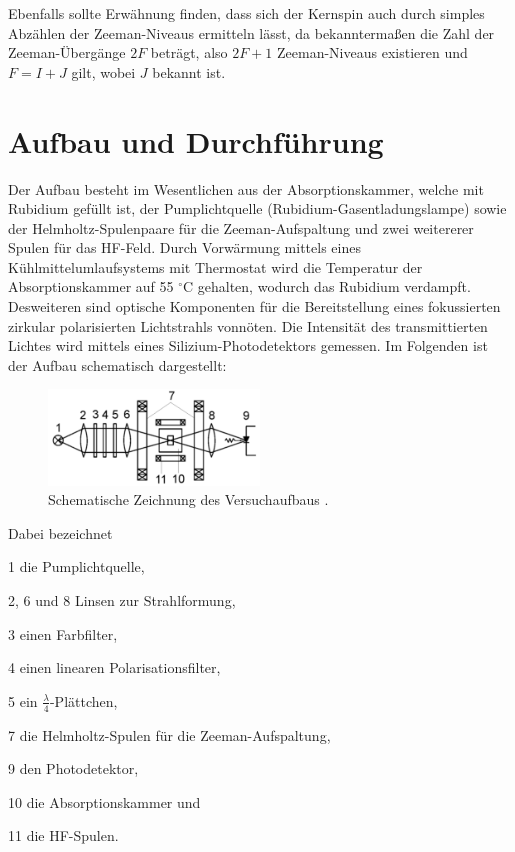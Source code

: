\documentclass[bigchapter,colorback,accentcolor=tud4b,linedtoc,11pt]{tudreport}
\begin{document}
Ebenfalls sollte Erwähnung finden, dass sich der Kernspin auch durch simples Abzählen der Zeeman-Niveaus ermitteln lässt, da bekanntermaßen die Zahl der Zeeman-Übergänge $2F$ beträgt, also $2F+1$ Zeeman-Niveaus existieren und $F= I+J$ gilt, wobei $J$ bekannt ist.

\chapter{Aufbau und Durchführung}

Der Aufbau besteht im Wesentlichen aus der Absorptionskammer, welche mit Rubidium gefüllt ist, der Pumplichtquelle (Rubidium-Gasentladungslampe) sowie der Helmholtz-Spulenpaare für die Zeeman-Aufspaltung und zwei weitererer Spulen für das HF-Feld. Durch Vorwärmung mittels eines Kühlmittelumlaufsystems mit Thermostat wird die Temperatur der Absorptionskammer auf 55 $^{\circ}$C gehalten, wodurch das Rubidium verdampft. Desweiteren sind optische Komponenten für die Bereitstellung eines fokussierten zirkular polarisierten Lichtstrahls vonnöten. Die Intensität des transmittierten Lichtes wird mittels eines Silizium-Photodetektors gemessen. Im Folgenden ist der Aufbau schematisch dargestellt:

\begin{figure}[H] 
  \centering
     \includegraphics[width=0.5\textwidth]{img/Aufbau.jpg}
     \caption{Schematische Zeichnung des Versuchaufbaus \cite{Anleitung}.}
\end{figure}

Dabei bezeichnet

1 die Pumplichtquelle,

2, 6 und 8 Linsen zur Strahlformung,

3 einen Farbfilter,

4 einen linearen Polarisationsfilter,

5 ein $\frac{\lambda}{4}$-Plättchen,

7 die Helmholtz-Spulen für die Zeeman-Aufspaltung,

9 den Photodetektor,

10 die Absorptionskammer und

11 die HF-Spulen.
\end{document}
